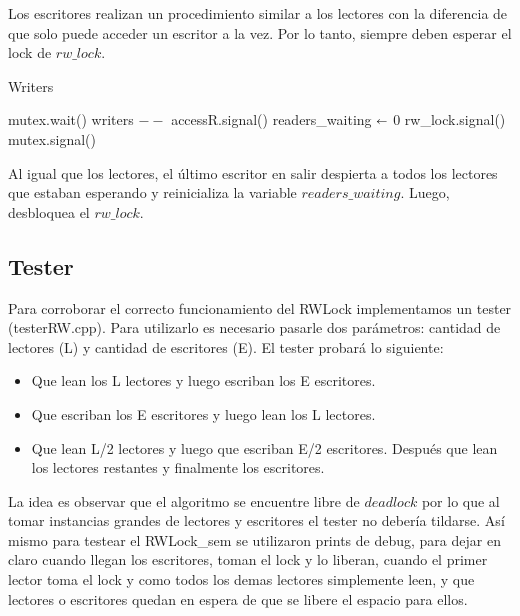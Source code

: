 Los escritores realizan un procedimiento similar a los lectores con la diferencia de que solo puede acceder un escritor a la vez. Por lo tanto, siempre deben esperar el lock de $rw\_lock$.

\begin{algorithm}[H]
\caption{Writers}\label{ej1}
\begin{algorithmic}[1]
	\State mutex.wait()
	\State writers $--$
				\State accessR.signal()
			\EndFor
			\State readers\_waiting $\shortleftarrow$ 0
		\EndIf
	\EndIf
	\State rw\_lock.signal()
	\State mutex.signal()
\EndProcedure
\end{algorithmic}
\end{algorithm}

Al igual que los lectores, el último escritor en salir despierta a todos los lectores que estaban esperando y reinicializa la variable $readers\_waiting$. Luego, desbloquea el $rw\_lock$.

\subsection{Tester}

Para corroborar el correcto funcionamiento del RWLock implementamos un tester (testerRW.cpp). Para utilizarlo es necesario pasarle dos parámetros: cantidad de lectores (L) y cantidad de escritores (E). El tester probará lo siguiente:

\begin{itemize}
	\item Que lean los L lectores y luego escriban los E escritores.
	\item Que escriban los E escritores y luego lean los L lectores.
	\item Que lean L/2 lectores y luego que escriban E/2 escritores. Después que lean los lectores restantes y finalmente los escritores.
\end{itemize}

La idea es observar que el algoritmo se encuentre libre de $deadlock$ por lo que al tomar instancias grandes de lectores y escritores el tester no debería tildarse. Así mismo para testear el RWLock\_sem se utilizaron prints de debug, para dejar en claro cuando llegan los escritores, toman el lock y lo liberan, cuando el primer lector toma el lock y como todos los demas lectores simplemente leen, y que lectores o escritores quedan en espera de que se libere el espacio para ellos.




